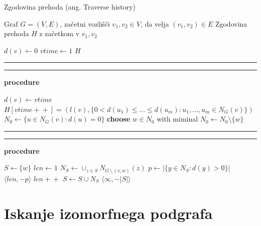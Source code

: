 \documentclass[a4paper, 12pt, ]{book}
\newcommand\Subalg[1]{%
	\Statex%
	\vspace*{-.7\baselineskip}%
	\hspace*{\dimexpr-\algorithmicindent-4pt\relax}%
	\rule{\textwidth}{0.4pt}%
	\Statex%
	
	\vspace*{-.7\baselineskip}%
	\Statex\hspace*{\dimexpr-\algorithmicindent-2pt\relax}%
	\rule{\textwidth}{0.4pt}%
	
	\Statex\hspace*{-\algorithmicindent}\textbf{procedure} #1%
}
\begin{document}
\begin{algorithm}
\caption{Zgodovina prehoda (ang. Traverse history)}
\label{alg:sub_th}
\begin{algorithmic}[1]
	\Require Graf $G = (V, E)$, začetni vozlišči $v_1, v_2 \in V$, da velja $(v_1, v_2) \in E$
	\Ensure Zgodovina prehoda $H$ z začetkom v $v_1, v_2$

		\State $d(v) \gets 0$
	\EndFor
	\State $vtime \gets 1$
	\State {}
	\State \Return $H$


	\Subalg{}
	\State $d(v) \gets vtime$
	\State $H[vtime+\!+] = (l(v), \{0 < d(u_1) \leq \ldots \leq d(u_m) : u_1, \ldots, u_m \in N_G(v)\})$
	\EndIf
	\State $N_0 \gets \{ u \in N_G(v): d(u) = 0 \}$
		\State \textbf{choose} $w \in N_0$ with miminal 
		\EndIf
		\State $N_0 \gets N_0 \setminus \{w\}$
	\EndWhile


	\Subalg{}	
	\State $S \gets \{w\}$
	\State $len \gets 1$
	\Repeat
		\State $N_S \gets \cup_{z \in S}N_{G\, \setminus\,  (v,w)}(z)$
		\State $p \gets | \{ y \in N_S: d(y) > 0 \} |$
			\Return $\langle len, -p \rangle$
		\EndIf
		\State $len+\!+$
		\State $S \gets S \cup N_S$
	\State \Return $ \langle \infty, -|S| \rangle $
\end{algorithmic}
\end{algorithm}



	\section{Iskanje izomorfnega podgrafa}
	\label{sub:search}
	
\end{document}
